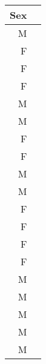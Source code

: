 \documentclass[preview]{standalone}
\begin{document}
\centering 
        \begin{table}[ht]

        \begin{tabular}{rl}
          \hline
          Sex \\
          \hline
         M \\
           F \\
           F \\
           F \\
           M \\
           M \\
           F \\
           F \\
           M \\
          M \\
          F \\
          F \\
          F \\
          F \\
          M \\
          M \\
          M \\
          M \\
          M \\
           \hline
        \end{tabular}
        \end{table}
\end{document}

